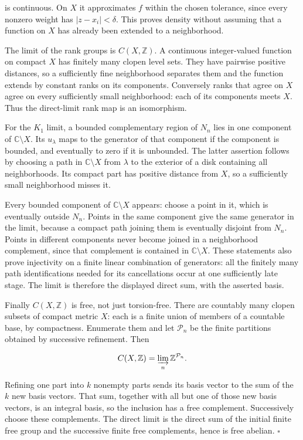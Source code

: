 \documentclass[
  11pt,
]{article}
\newcounter{none} %
\begin{document}
is continuous. On \(X\) it approximates \(f\) within the chosen
tolerance, since every nonzero weight has \(|z-x_i|<\delta\). This
proves density without assuming that a function on \(X\) has already
been extended to a neighborhood.

The limit of the rank groups is \(C(X,\mathbb Z)\). A continuous
integer-valued function on compact \(X\) has finitely many clopen level
sets. They have pairwise positive distances, so a sufficiently fine
neighborhood separates them and the function extends by constant ranks
on its components. Conversely ranks that agree on \(X\) agree on every
sufficiently small neighborhood: each of its components meets \(X\).
Thus the direct-limit rank map is an isomorphism.

For the \(K_1\) limit, a bounded complementary region of \(N_n\) lies in
one component of \(\mathbb C\setminus X\). Its \(u_\lambda\) maps to the
generator of that component if the component is bounded, and eventually
to zero if it is unbounded. The latter assertion follows by choosing a
path in \(\mathbb C\setminus X\) from \(\lambda\) to the exterior of a
disk containing all neighborhoods. Its compact part has positive
distance from \(X\), so a sufficiently small neighborhood misses it.

Every bounded component of \(\mathbb C\setminus X\) appears: choose a
point in it, which is eventually outside \(N_n\). Points in the same
component give the same generator in the limit, because a compact path
joining them is eventually disjoint from \(N_n\). Points in different
components never become joined in a neighborhood complement, since that
complement is contained in \(\mathbb C\setminus X\). These statements
also prove injectivity on a finite linear combination of generators: all
the finitely many path identifications needed for its cancellations
occur at one sufficiently late stage. The limit is therefore the
displayed direct sum, with the asserted basis.

Finally \(C(X,\mathbb Z)\) is free, not just torsion-free. There are
countably many clopen subsets of compact metric \(X\): each is a finite
union of members of a countable base, by compactness. Enumerate them and
let \(\mathcal P_n\) be the finite partitions obtained by successive
refinement. Then

\[
C(X,\mathbb Z)=\varinjlim_n\mathbb Z^{\mathcal P_n}.
\]

Refining one part into \(k\) nonempty parts sends its basis vector to
the sum of the \(k\) new basis vectors. That sum, together with all but
one of those new basis vectors, is an integral basis, so the inclusion
has a free complement. Successively choose these complements. The direct
limit is the direct sum of the initial finite free group and the
successive finite free complements, hence is free abelian. \(\square\)
\end{document}
